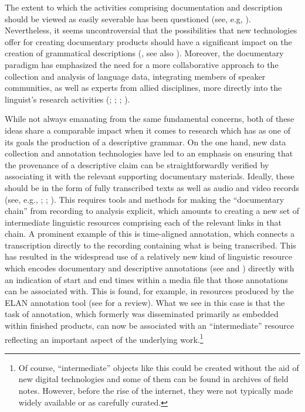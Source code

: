 The extent to which the activities comprising documentation and description
should be viewed as easily severable has been questioned (see, e.g,
). Nevertheless, it seems uncontroversial that
the possibilities that new technologies offer for creating documentary products
should have a significant impact on the creation of grammatical descriptions
(\citet[24--25]{EvansDench:2006}, see also \citet[120--122]{Good:LDPV}).
Moreover, the documentary paradigm has emphasized the need for a more
collaborative approach to the collection and analysis of language data,
integrating members of speaker communities, as well as experts from allied
disciplines, more directly into the linguist's research activities
(; ;
; ).

While not always emanating from the same fundamental concerns, both of these
ideas share a comparable impact when it comes to research which has as one of
its goals the production of a descriptive grammar. On the one hand, new data
collection and annotation technologies have led to an emphasis on ensuring that
the provenance of a descriptive claim can be straightforwardly verified by
associating it with the relevant supporting documentary materials. Ideally,
these should be in the form of fully transcribed texts as well as audio and
video records (see, e.g., ;
; ). This requires tools
and methods for making the ``documentary chain'' from recording to analysis
explicit, which amounts to creating a new set of intermediate linguistic
resources comprising each of the relevant links in that chain. A prominent
example of this is time-aligned annotation, which connects a transcription
directly to the recording containing what is being transcribed. This has
resulted in the widespread use of a relatively new kind of linguistic resource
which encodes documentary and descriptive annotations (see
 and \citet{Boudatv}) directly with an indication of start and end
times within a media file that those annotations can be associated with. This is
found, for example, in resources produced by the ELAN annotation tool (see
 for a review). What we see in this case is that the task
of annotation, which formerly was disseminated primarily as embedded within
finished products, can now be associated with an ``intermediate'' resource
reflecting an important aspect of the underlying work.{\footnote{Of course,
``intermediate'' objects like this could be created without the aid of new
digital technologies and some of them can be found in archives of field notes.
However, before the rise of the internet, they were not typically made widely
available or as carefully curated.}}

